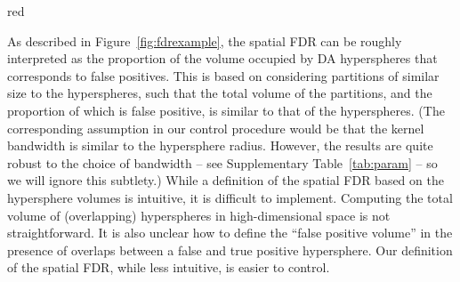 \documentclass{article}
\begin{document}
\begin{color}{red}

As described in Figure~\ref{fig:fdrexample}, the spatial FDR can be roughly interpreted as the proportion of the volume occupied by DA hyperspheres that corresponds to false positives.
This is based on considering partitions of similar size to the hyperspheres, such that the total volume of the partitions, and the proportion of which is false positive, is similar to that of the hyperspheres.
(The corresponding assumption in our control procedure would be that the kernel bandwidth is similar to the hypersphere radius.
However, the results are quite robust to the choice of bandwidth -- see Supplementary Table~\ref{tab:param} -- so we will ignore this subtlety.)
While a definition of the spatial FDR based on the hypersphere volumes is intuitive, it is difficult to implement.
Computing the total volume of (overlapping) hyperspheres in high-dimensional space is not straightforward.
It is also unclear how to define the ``false positive volume'' in the presence of overlaps between a false and true positive hypersphere.
Our definition of the spatial FDR, while less intuitive, is easier to control.
\end{color}
\end{document}
